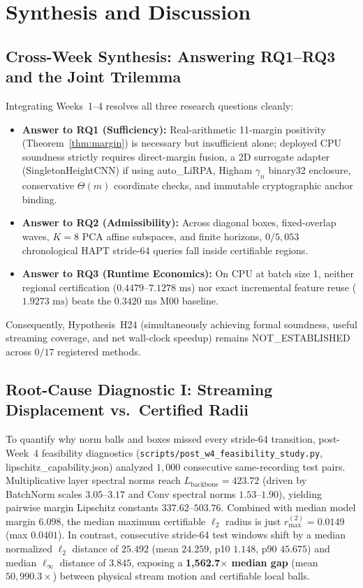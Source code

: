 \documentclass[11pt,oneside,a4paper]{report}
\newcommand{\code}[1]{{\small\upshape\ttfamily #1}}
\theoremstyle{remark}
\begin{document}
\chapter{Synthesis and Discussion}

\section{Cross-Week Synthesis: Answering RQ1--RQ3 and the Joint Trilemma}
Integrating Weeks~1--4 resolves all three research questions cleanly:
\begin{itemize}[leftmargin=1.5em]
  \item \textbf{Answer to RQ1 (Sufficiency):} Real-arithmetic 11-margin positivity (Theorem~\ref{thm:margin}) is necessary but insufficient alone; deployed CPU soundness strictly requires direct-margin fusion, a 2D surrogate adapter (\code{SingletonHeightCNN}) if using \code{auto\_LiRPA}, Higham $\gamma_n$ \code{binary32} enclosure, conservative $\Theta(m)$ coordinate checks, and immutable cryptographic anchor binding.
  \item \textbf{Answer to RQ2 (Admissibility):} Across diagonal boxes, fixed-overlap waves, $K=8$ PCA affine subspaces, and finite horizons, $0/5,053$ chronological HAPT stride-64 queries fall inside certifiable regions.
  \item \textbf{Answer to RQ3 (Runtime Economics):} On CPU at batch size 1, neither regional certification ($0.4479\text{--}7.1278\text{ ms}$) nor exact incremental feature reuse ($1.9273\text{ ms}$) beats the $0.3420\text{ ms}$ \code{M00} baseline.
\end{itemize}
Consequently, Hypothesis~\code{H24} (simultaneously achieving formal soundness, useful streaming coverage, and net wall-clock speedup) remains \code{NOT\_ESTABLISHED} across $0/17$ registered methods.

\section{Root-Cause Diagnostic I: Streaming Displacement vs.\ Certified Radii}
To quantify why norm balls and boxes missed every stride-64 transition, post-Week~4 feasibility diagnostics (\nolinkurl{scripts/post_w4_feasibility_study.py}, \code{lipschitz\_capability.json}) analyzed $1,000$ consecutive same-recording test pairs. Multiplicative layer spectral norms reach $L_{\text{backbone}} = 423.72$ (driven by BatchNorm scales $3.05\text{--}3.17$ and Conv spectral norms $1.53\text{--}1.90$), yielding pairwise margin Lipschitz constants $337.62\text{--}503.76$. Combined with median model margin $6.098$, the median maximum certifiable $\ell_2$ radius is just $r_{\max}^{(2)} = 0.0149$ (max $0.0401$). In contrast, consecutive stride-64 test windows shift by a median normalized $\ell_2$ distance of $25.492$ (mean $24.259$, p10 $1.148$, p90 $45.675$) and median $\ell_\infty$ distance of $3.845$, exposing a \textbf{1,562.7$\times$ median gap} (mean $50,990.3\times$) between physical stream motion and certifiable local balls.
\end{document}
